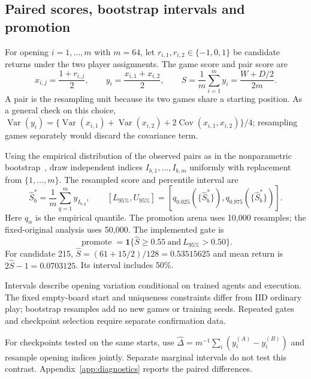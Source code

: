 \documentclass[letterpaper]{article}
\begin{document}
\subsection{Paired scores, bootstrap intervals and promotion}
\label{app:evaluation-math}
For opening $i=1,\ldots,m$ with $m=64$, let $r_{i,1},r_{i,2}\in\{-1,0,1\}$
be candidate returns under the two player assignments. The game score and pair
score are
\begin{equation}
 x_{i,j}=\frac{1+r_{i,j}}2,\qquad
 y_i=\frac{x_{i,1}+x_{i,2}}2,\qquad
 \widehat S=\frac1m\sum_{i=1}^{m}y_i=\frac{W+D/2}{2m}.
 \label{eq:paired-score}
\end{equation}
A pair is the resampling unit because its two games share a starting position.
As a general check on this choice,
$\operatorname{Var}(y_i)=\{\operatorname{Var}(x_{i,1})+
\operatorname{Var}(x_{i,2})+2\operatorname{Cov}(x_{i,1},x_{i,2})\}/4$;
resampling games separately would discard the covariance term.

Using the empirical distribution of the observed pairs as in the nonparametric
bootstrap~\cite{efron1979}, draw independent indices
$I_{b,1},\ldots,I_{b,m}$ uniformly with replacement from $\{1,\ldots,m\}$.
The resampled score and percentile interval are
\begin{equation}
 \widehat S_b^*=\frac1m\sum_{q=1}^m y_{I_{b,q}},\qquad
 [L_{95\%},U_{95\%}]=
 [q_{0.025}(\{\widehat S_b^*\}),q_{0.975}(\{\widehat S_b^*\})].
 \label{eq:bootstrap}
\end{equation}
Here $q_\alpha$ is the empirical quantile. The promotion arena uses 10,000
resamples; the fixed-original analysis uses 50,000. The implemented gate is
\begin{equation}
 \operatorname{promote}=\mathbf1\{
 \widehat S\geq0.55\ \text{and}\ L_{95\%}>0.50\}.
 \label{eq:gate}
\end{equation}
For candidate 215, $\widehat S=(61+15/2)/128=0.53515625$ and mean return is
$2\widehat S-1=0.0703125$. Its interval includes 50\%.

Intervals describe opening variation conditional on trained agents and execution.
The fixed empty-board start and uniqueness constraints differ from IID ordinary
play; bootstrap resamples add no new games or training seeds. Repeated gates and
checkpoint selection require separate confirmation data.

For checkpoints tested on the same starts, use
$\widehat\Delta=m^{-1}\sum_i(y_i^{(A)}-y_i^{(B)})$ and resample opening indices
jointly. Separate marginal intervals do not test this contrast.
Appendix~\ref{app:diagnostics} reports the paired differences.
\end{document}
